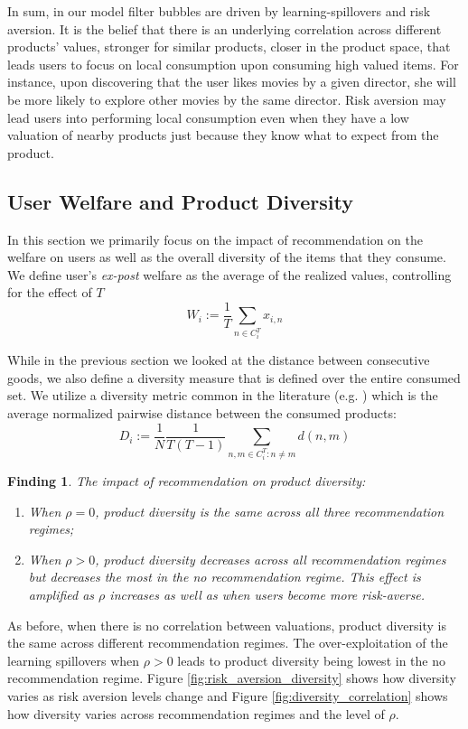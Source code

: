 \documentclass[sigconf]{acmart}
\newtheorem{finding}{Finding}
\begin{document}
In sum, in our model filter bubbles are driven by learning-spillovers and risk aversion. It is the belief that there is an underlying correlation across different products' values, stronger for similar products, closer in the product space, that leads users to focus on local consumption upon consuming high valued items. For instance, upon discovering that the user likes movies by a given director, she will be more likely to explore other movies by the same director. Risk aversion may lead users into performing local consumption even when they have a low valuation of nearby products just because they know what to expect from the product.
\par

\subsection{User Welfare and Product Diversity}
In this section we primarily focus on the impact of recommendation on the welfare on users as well as the overall diversity of the items that they consume. We define user's \textit{ex-post} welfare as the average of the realized values, controlling for the effect of $T$
$$W_i:= \frac{1}{T}\sum_{n \in C_i^T} x_{i,n}$$

While in the previous section we looked at the distance between consecutive goods, we also define a diversity measure that is defined over the entire consumed set. We utilize a diversity metric common in the literature (e.g. \cite{ziegler2005improving}) which is the average normalized pairwise distance between the consumed products:
$$D_i:=\frac{1}{N}\frac{1}{T(T-1)}\sum_{n,m \in C_i^T: n \ne m} d(n,m)$$

\begin{finding}\label{finding_diversity}
The impact of recommendation on product diversity:
\begin{enumerate}
\item When $\rho = 0$, product diversity is the same across all three recommendation regimes;
\item When $\rho > 0$, product diversity decreases across all recommendation regimes but decreases the most in the no recommendation regime. This effect is amplified as $\rho$ increases as well as when users become more risk-averse.
\end{enumerate}
\end{finding}

As before, when there is no correlation between valuations, product diversity is the same across different recommendation regimes. The over-exploitation of the learning spillovers when $\rho > 0$ leads to product diversity being lowest in the no recommendation regime.  Figure \ref{fig:risk_aversion_diversity} shows how diversity varies as risk aversion levels change and Figure \ref{fig:diversity_correlation} shows how diversity varies across recommendation regimes and the level of $\rho$.
\end{document}
